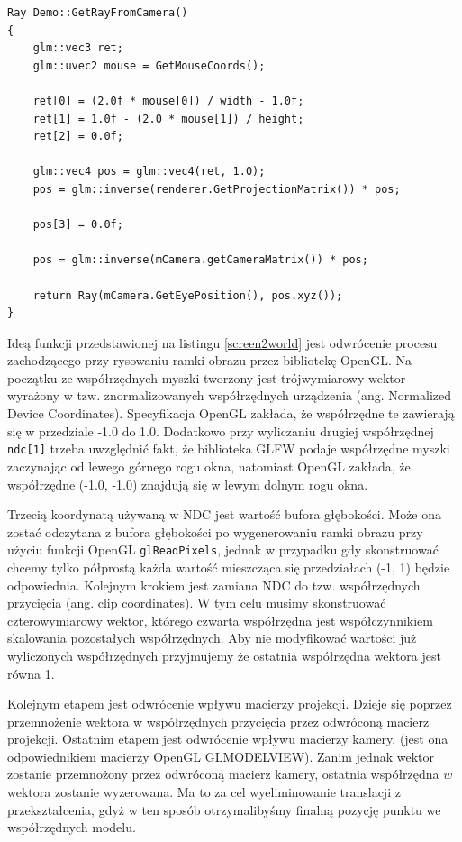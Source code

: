 \begin{lstlisting}[caption=Estymacja wektora w przstrzeni trójwymiarowej na
	podstawie pozycji myszki na ekranie, label=screen2world]
Ray Demo::GetRayFromCamera()
{
	glm::vec3 ret;
	glm::uvec2 mouse = GetMouseCoords();

	ret[0] = (2.0f * mouse[0]) / width - 1.0f;
	ret[1] = 1.0f - (2.0 * mouse[1]) / height;
	ret[2] = 0.0f;

	glm::vec4 pos = glm::vec4(ret, 1.0);
	pos = glm::inverse(renderer.GetProjectionMatrix()) * pos;

	pos[3] = 0.0f;

	pos = glm::inverse(mCamera.getCameraMatrix()) * pos;

	return Ray(mCamera.GetEyePosition(), pos.xyz());
}
\end{lstlisting}

Ideą funkcji przedstawionej na listingu \ref{screen2world} jest odwrócenie
procesu zachodzącego przy rysowaniu ramki obrazu przez bibliotekę OpenGL.
Na początku ze współrzędnych myszki tworzony jest trójwymiarowy wektor
wyrażony w tzw. znormalizowanych współrzędnych urządzenia (ang. Normalized
		Device Coordinates). Specyfikacja OpenGL zakłada, że współrzędne te zawierają się w
przedziale -1.0 do 1.0. Dodatkowo przy wyliczaniu drugiej współrzędnej
\texttt{ndc[1]} trzeba uwzględnić fakt, że biblioteka GLFW podaje współrzędne
myszki zaczynając od lewego górnego rogu okna, natomiast OpenGL zakłada, że
współrzędne (-1.0, -1.0) znajdują się w lewym dolnym rogu okna.

Trzecią koordynatą używaną w NDC jest wartość bufora głębokości. Może ona zostać
odczytana z bufora głębokości po wygenerowaniu ramki obrazu przy użyciu funkcji
OpenGL \texttt{glReadPixels}, jednak w przypadku gdy skonstruować chcemy tylko
półprostą każda wartość mieszcząca się przedziałach (-1, 1) będzie odpowiednia.
Kolejnym krokiem jest zamiana NDC do tzw. współrzędnych przycięcia (ang. clip
		coordinates). W tym celu musimy skonstruować czterowymiarowy wektor,
		 którego czwarta współrzędna jest współczynnikiem skalowania pozostałych
		 współrzędnych. Aby nie modyfikować wartości już wyliczonych
		 współrzędnych przyjmujemy że ostatnia współrzędna wektora jest równa 1.
		 
Kolejnym etapem jest odwrócenie wpływu macierzy projekcji. Dzieje się
poprzez przemnożenie wektora w współrzędnych przycięcia przez odwróconą
macierz projekcji. Ostatnim etapem jest odwrócenie wpływu macierzy
kamery, (jest ona odpowiednikiem macierzy OpenGL GLMODELVIEW).
Zanim jednak wektor zostanie przemnożony przez odwróconą macierz kamery,
	  ostatnia współrzędna $w$ wektora zostanie wyzerowana. Ma to za cel
	  wyeliminowanie translacji z przekształcenia, gdyż w ten sposób
	  otrzymalibyśmy finalną pozycję punktu we współrzędnych modelu.

